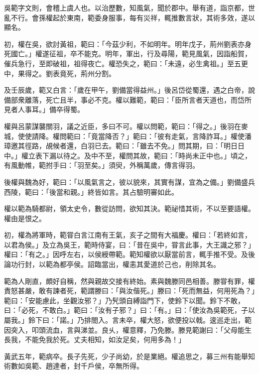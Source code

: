 \begin{pinyinscope}
 
 
 吳範字文則，會稽上虞人也。以治歷數，知風氣，聞於郡中。舉有道，詣京都，世亂不行。會孫權起於東南，範委身服事，每有災祥，輒推數言狀，其術多效，遂以顯名。
 
 
 
 
 初，權在吳，欲討黃祖，範曰：「今茲少利，不如明年。明年戊子，荊州劉表亦身死國亡。」權遂征祖，卒不能克。明年，軍出，行及尋陽，範見風氣，因詣船賀，催兵急行，至即破祖，祖得夜亡。權恐失之，範曰：「未遠，必生禽祖。」至五更中，果得之。劉表竟死，荊州分割。
 
 
 
 
 及壬辰歲，範又白言：「歲在甲午，劉備當得益州。」後呂岱從蜀還，遇之白帝，說備部衆離落，死亡且半，事必不克。權以難範，範曰：「臣所言者天道也，而岱所見者人事耳。」備卒得蜀。
 
 
 
 
 權與呂蒙謀襲關羽，議之近臣，多曰不可。權以問範，範曰：「得之。」後羽在麥城，使使請降。權問範曰：「竟當降否？」範曰：「彼有走氣，言降詐耳。」權使潘璋邀其徑路，覘候者還，白羽已去。範曰：「雖去不免。」問其期，曰：「明日日中。」權立表下漏以待之。及中不至，權問其故，範曰：「時尚未正中也。」頃之，有風動帷，範拊手曰：「羽至矣。」須臾，外稱萬歲，傳言得羽。
 
 
 
 
 後權與魏為好，範曰：「以風氣言之，彼以貌來，其實有謀，宜為之備。」劉備盛兵西陵，範曰：「後當和親。」終皆如言。其占驗明審如此。
 
 
 
 
 權以範為騎都尉，領太史令，數從訪問，欲知其決。範祕惜其術，不以至要語權。權由是恨之。
 
 
 
 
 
 
 初，權為將軍時，範甞白言江南有王氣，亥子之間有大福慶。權曰：「若終如言，以君為侯。」及立為吳王，範時侍宴，曰：「昔在吳中，甞言此事，大王識之邪？」權曰：「有之。」因呼左右，以侯綬帶範。範知權欲以厭當前言，輒手推不受。及後論功行封，以範為都亭侯。詔臨當出，權恚其愛道於己也，削除其名。
 
 
範為人剛直，頗好自稱，然與親故交接有終始。素與魏滕同邑相善。滕甞有罪，權責怒甚嚴，敢有諫者死，範謂滕曰：「與汝偕死。」滕曰：「死而無益，何用死為？」範曰：「安能慮此，坐觀汝邪？」乃髠頭自縛詣門下，使鈴下以聞。鈴下不敢，曰：「必死，不敢白。」範曰：「汝有子邪？」曰：「有。」曰：「使汝為吳範死，子以屬我。」鈴下曰：「諾。」乃排閤入。言未卒，權大怒，欲便投以戟。逡巡走出，範因突入，叩頭流血，言與涕並。良乆，權意釋，乃免滕。滕見範謝曰：「父母能生長我，不能免我於死。丈夫相知，如汝足矣，何用多為！」
 
 
黃武五年，範病卒。長子先死，少子尚幼，於是業絕。權追思之，募三州有能舉知術數如吳範、趙達者，封千戶侯，卒無所得。
 
 
\end{pinyinscope}